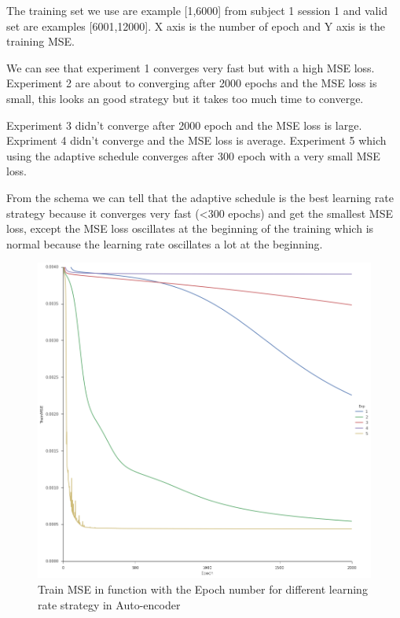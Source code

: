 The training set we use are example [1,6000] from subject 1 session 1 and valid set are examples [6001,12000]. X axis is the number of epoch and Y axis is the training MSE.

We can see that experiment 1 converges very fast but with a high MSE loss. Experiment 2 are about to converging after 2000 epochs and the MSE loss is small, this looks an good strategy but it takes too much time to converge.

Experiment 3 didn't converge after 2000 epoch and the MSE loss is large. Expriment 4 didn't converge and the MSE loss is average. Experiment 5 which using the adaptive schedule converges after 300 epoch with a very small MSE loss.

From the schema we can tell that the adaptive schedule is the best learning rate strategy because it converges very fast (\textless 300 epochs) and get the smallest MSE loss, except the MSE loss oscillates at the beginning of the training which is normal because the learning rate oscillates a lot at the beginning.
\begin{figure}[htbp]
	\centering
	\includegraphics[width=15cm]{Figures/3.png}
	\caption[Train MSE in function with the Epoch number for different learning rate strategy in Auto-encoder]{Train MSE in function with the Epoch number for different learning rate strategy in Auto-encoder}
	\label{fig:3}
\end{figure}
